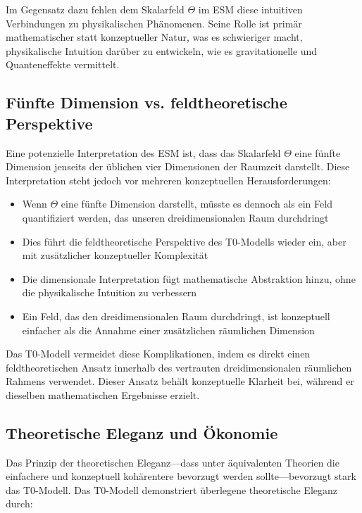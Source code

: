 \documentclass[12pt,a4paper]{article}
\begin{document}
	Im Gegensatz dazu fehlen dem Skalarfeld \(\Theta\) im ESM diese intuitiven Verbindungen zu physikalischen Phänomenen. Seine Rolle ist primär mathematischer statt konzeptueller Natur, was es schwieriger macht, physikalische Intuition darüber zu entwickeln, wie es gravitationelle und Quanteneffekte vermittelt.
	
	\subsection{Fünfte Dimension vs. feldtheoretische Perspektive}
	\label{subsec:fifth_dimension_vs_field}
	
	Eine potenzielle Interpretation des ESM ist, dass das Skalarfeld \(\Theta\) eine fünfte Dimension jenseits der üblichen vier Dimensionen der Raumzeit darstellt. Diese Interpretation steht jedoch vor mehreren konzeptuellen Herausforderungen:
	
	\begin{itemize}
		\item Wenn \(\Theta\) eine fünfte Dimension darstellt, müsste es dennoch als ein Feld quantifiziert werden, das unseren dreidimensionalen Raum durchdringt
		\item Dies führt die feldtheoretische Perspektive des T0-Modells wieder ein, aber mit zusätzlicher konzeptueller Komplexität
		\item Die dimensionale Interpretation fügt mathematische Abstraktion hinzu, ohne die physikalische Intuition zu verbessern
		\item Ein Feld, das den dreidimensionalen Raum durchdringt, ist konzeptuell einfacher als die Annahme einer zusätzlichen räumlichen Dimension
	\end{itemize}
	
	Das T0-Modell vermeidet diese Komplikationen, indem es direkt einen feldtheoretischen Ansatz innerhalb des vertrauten dreidimensionalen räumlichen Rahmens verwendet. Dieser Ansatz behält konzeptuelle Klarheit bei, während er dieselben mathematischen Ergebnisse erzielt.
	
	\subsection{Theoretische Eleganz und Ökonomie}
	\label{subsec:theoretical_elegance}
	
	Das Prinzip der theoretischen Eleganz—dass unter äquivalenten Theorien die einfachere und konzeptuell kohärentere bevorzugt werden sollte—bevorzugt stark das T0-Modell. Das T0-Modell demonstriert überlegene theoretische Eleganz durch:
	
\end{document}
